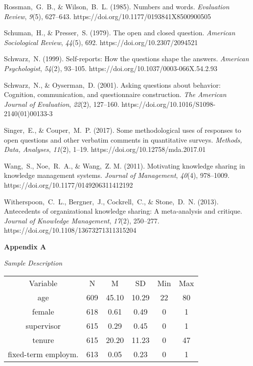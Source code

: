 \documentclass{article}
\begin{document}
Rossman, G. B., \& Wilson, B. L. (1985). Numbers and words. \emph{Evaluation Review}, \emph{9}(5), 627--643. https://doi.org/10.1177/0193841X8500900505

Schuman, H., \& Presser, S. (1979). The open and closed question. \emph{American Sociological Review}, \emph{44}(5), 692. https://doi.org/10.2307/2094521

Schwarz, N. (1999). Self-reports: How the questions shape the answers. \emph{American Psychologist}, \emph{54}(2), 93--105. https://doi.org/10.1037/0003-066X.54.2.93

Schwarz, N., \& Oyserman, D. (2001). Asking questions about behavior: Cognition, communication, and questionnaire construction. \emph{The American Journal of Evaluation}, \emph{22}(2), 127--160. https://doi.org/10.1016/S1098-2140(01)00133-3

Singer, E., \& Couper, M. P. (2017). Some methodological uses of responses to open questions and other verbatim comments in quantitative surveys. \emph{Methods, Data, Analyses}, \emph{11}(2), 1--19. https://doi.org/10.12758/mda.2017.01

Wang, S., Noe, R. A., \& Wang, Z. M. (2011). Motivating knowledge sharing in knowledge management systems. \emph{Journal of Management}, \emph{40}(4), 978--1009. https://doi.org/10.1177/0149206311412192

Witherspoon, C. L., Bergner, J., Cockrell, C., \& Stone, D. N. (2013). Antecedents of organizational knowledge sharing: A meta-analysis and critique. \emph{Journal of Knowledge Management}, \emph{17}(2), 250--277. https://doi.org/10.1108/13673271311315204



\textbf{}

\textbf{}

\textbf{Appendix A}

\emph{Sample Description}


\begin{table}

  
\begin{tabular}{c  c  c  c  c  c}

  Variable & N & M & SD & Min & Max\\
age & 609 & 45.10 & 10.29 & 22 & 80\\
female & 618 & 0.61 & 0.49 & 0 & 1\\
supervisor & 615 & 0.29 & 0.45 & 0 & 1\\
tenure & 615 & 20.20 & 11.23 & 0 & 47\\
fixed-term employm. & 613 & 0.05 & 0.23 & 0 & 1\\


\end{tabular}


\end{table}
\textbf{}
\end{document}
